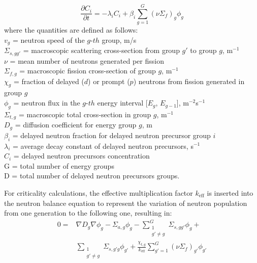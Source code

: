 \documentclass{elsarticle}
\newcommand{\keff}{{\ensuremath{k_{\mathrm{eff}}}} }
\begin{document}
\begin{equation}
    \frac{\partial C_i}{\partial t} = -\lambda_i C_i + \beta_i \sum_{g=1}^G (\nu \Sigma_f)_g \phi_g 
  \label{eq:delayed_neutrons}
\end{equation}
%
where the quantities are defined as follows:
\\
$v_g$ = neutron speed of the $g$-$th$ group, m/s
\\
  $\Sigma_{s, gg'}$ = macroscopic scattering cross-section from group $g'$ to group $g$, m$^{-1}$
\\
  $\nu$ = mean number of neutrons generated per fission
\\
$\Sigma_{f,g}$ = macroscopic fission cross-section of group $g$, m$^{-1}$
\\
  $\chi_g$ = fraction of delayed ($d$) or prompt ($p$) neutrons from fission generated in group $g$ 
\\
  $\phi_{g}$ = neutron flux in the $g$-$th$ energy interval [$E_g$, $E_{g-1}$], m$^{-2}$s$^{-1}$
\\
  $\Sigma_{t,g}$ = macroscopic total cross-section in group $g$, m$^{-1}$
\\
%
  $D_g$ = diffusion coefficient for energy group $g$, m
\\
  $\beta_i$ = delayed neutron fraction for delayed neutron precursor group $i$
\\
  $\lambda_i$ = average decay constant of delayed neutron precursors, s$^{-1}$
\\
  $C_i$ = delayed neutron precursors concentration
 \\
 G = total number of energy groups\\
 D = total number of delayed neutron precursors groups.
  


For criticality calculations, the effective multiplication factor \keff is inserted into the neutron balance equation to represent the variation of neutron population from one generation to the following one, resulting in:
  \begin{align}
    0 =& \nabla D_g \nabla \phi_g - \Sigma_{a,g}\phi_g - \sum_{\substack{1\\g'\neq g}}^G \Sigma_{s, gg'}\phi_{g} + \\\nonumber &\sum_{\substack{1\\g'\neq g}} \Sigma_{s, g'g}\phi_{g'} + \frac{\chi_{t,g}}{k_{\mathrm{eff}}}\sum_{g'=1}^G(\nu \Sigma_f)_{g'} \phi_{g'}
  \end{align}
\end{document}
